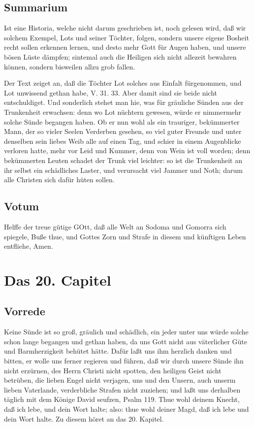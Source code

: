 \section{Summarium}

Ist eine Historia, welche nicht darum geschrieben ist, noch gelesen wird, daß wir solchem Exempel, Lots und seiner Töchter, folgen, sondern unsere eigene Bosheit recht sollen erkennen lernen, und desto mehr Gott für Augen haben, und unsere bösen Lüste dämpfen; sintemal auch die Heiligen sich nicht allezeit bewahren können, sondern bisweilen allzu grob fallen.

Der Text zeiget an, daß die Töchter Lot solches aus Einfalt fürgenommen, und Lot unwissend gethan habe, V. 31. 33. Aber damit sind sie beide nicht entschuldiget. Und sonderlich stehet man hie, was für gräuliche Sünden aus der Trunkenheit erwachsen: denn wo Lot nüchtern gewesen, würde er nimmermehr solche Sünde begangen haben. Ob er nun wohl als ein trauriger, bekümmerter Mann, der so vieler Seelen Verderben gesehen, so viel guter Freunde und unter denselben sein liebes Weib alle auf einen Tag, und schier in einem Augenblicke verloren hatte, mehr vor Leid und Kummer, denn von Wein ist voll worden; denn bekümmerten Leuten schadet der Trunk viel leichter: so ist die Trunkenheit an ihr selbst ein schädliches Laster, und verursacht viel Jammer und Noth; darum alle Christen sich dafür hüten sollen.

\section{Votum}

Helffe der treue gütige GOtt, daß alle Welt an Sodoma und Gomorra sich spiegele, Buße thue, und Gottes Zorn und Strafe in diesem und künftigen Leben entfliehe, Amen.

\chapter{Das 20. Capitel}

\section{Vorrede}

Keine Sünde ist so groß, gräulich und schädlich, ein jeder unter uns würde solche schon lange begangen und gethan haben, da uns Gott nicht aus väterlicher Güte und Barmherzigkeit
behütet hätte. Dafür laßt uns ihm herzlich danken und bitten, er wolle uns ferner regieren und führen, daß wir durch unsere Sünde ihn nicht erzürnen, des Herrn Christi nicht spotten, den heiligen Geist nicht betrüben, die lieben Engel nicht verjagen, uns und den Unsern, auch unserm lieben Vaterlande, verderbliche Strafen nicht zuziehen; und laßt uns derhalben täglich mit dem Könige David seufzen, Psalm 119. Thue wohl deinem Knecht, daß ich lebe, und dein Wort halte; also: thue wohl deiner Magd, daß ich lebe und dein Wort halte. Zu diesem höret an das 20. Kapitel.

